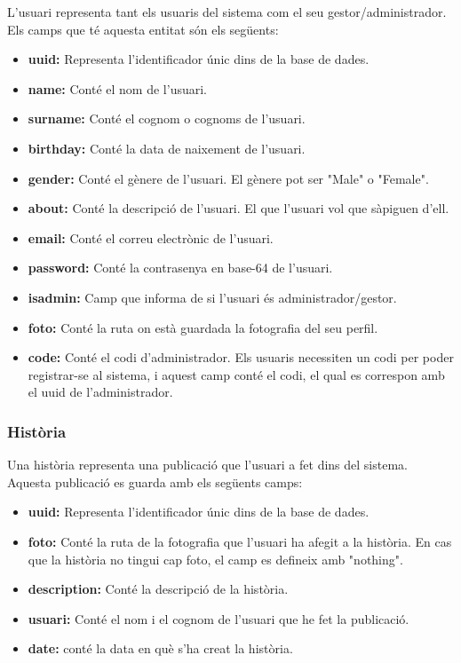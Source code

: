 \documentclass[11pt,catalan,listoffigures,listoftables]{tfgetsinf}
\begin{document}
L'usuari representa tant els usuaris del sistema com el seu gestor/administrador. Els camps que té aquesta entitat són els següents:
\begin{itemize}
\item \textbf{uuid:} Representa l'identificador únic dins de la base de dades.
\item \textbf{name:} Conté el nom de l'usuari.
\item \textbf{surname:} Conté el cognom o cognoms de l'usuari.
\item \textbf{birthday:} Conté la data de naixement de l'usuari.
\item \textbf{gender:} Conté el gènere de l'usuari. El gènere pot ser "Male" o "Female".
\item \textbf{about:} Conté la descripció de l'usuari. El que l'usuari vol que sàpiguen d'ell.
\item \textbf{email:} Conté el correu electrònic de l'usuari.
\item \textbf{password:} Conté la contrasenya en base-64 de l'usuari.
\item \textbf{isadmin:} Camp que informa de si l'usuari és administrador/gestor.
\item \textbf{foto:} Conté la ruta on està guardada la fotografia del seu perfil.
\item \textbf{code:} Conté el codi d'administrador. Els usuaris necessiten un codi per poder registrar-se al sistema, i aquest camp conté el codi, el qual es correspon amb el uuid de l'administrador.
\end{itemize}

\subsubsection{Història}

Una història representa una publicació que l'usuari a fet dins del sistema. Aquesta publicació es guarda amb els següents camps:
\begin{itemize}
\item \textbf{uuid:} Representa l'identificador únic dins de la base de dades.
\item \textbf{foto:} Conté la ruta de la fotografia que l'usuari ha afegit a la història. En cas que la història no tingui cap foto, el camp es defineix amb "nothing".
\item \textbf{description:} Conté la descripció de la història.
\item \textbf{usuari:} Conté el nom i el cognom de l'usuari que he fet la publicació.
\item \textbf{date:} conté la data en què s'ha creat la història.
\end{itemize}
\end{document}
